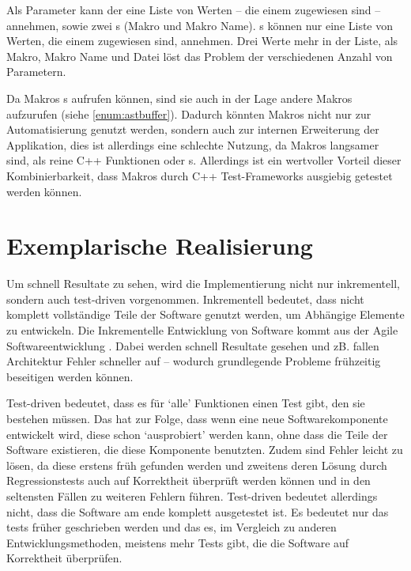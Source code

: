       Als Parameter kann der  eine Liste von  Werten -- die einem  zugewiesen sind -- annehmen, sowie zwei s (Makro und Makro Name). s können nur eine Liste von  Werten, die einem  zugewiesen sind, annehmen. Drei  Werte mehr in der Liste, als Makro, Makro Name und Datei löst das Problem der verschiedenen Anzahl von Parametern.

      Da Makros s aufrufen können, sind sie auch in der Lage andere Makros aufzurufen (siehe \ref{enum:astbuffer}). Dadurch könnten Makros nicht nur zur Automatisierung genutzt werden, sondern auch zur internen Erweiterung der Applikation, dies ist allerdings eine schlechte Nutzung, da Makros langsamer sind, als reine C++ Funktionen oder s. Allerdings ist ein wertvoller Vorteil dieser Kombinierbarkeit, dass Makros durch C++ Test-Frameworks ausgiebig getestet werden können.

\section{Exemplarische Realisierung}
\label{sec:Exemplarische Realisierung}
  Um schnell Resultate zu sehen, wird die Implementierung nicht nur inkrementell, sondern auch test-driven \autocite{beck2003test} vorgenommen. Inkrementell bedeutet, dass nicht komplett vollständige Teile der Software genutzt werden, um Abhängige Elemente zu entwickeln. Die Inkrementelle Entwicklung von Software kommt aus der Agile Softwareentwicklung \autocite{cohen2003agile}. Dabei werden schnell Resultate gesehen und zB. fallen Architektur Fehler schneller auf -- wodurch grundlegende Probleme frühzeitig beseitigen werden können.

  Test-driven bedeutet, dass es für `alle' Funktionen einen Test gibt, den sie bestehen müssen. Das hat zur Folge, dass wenn eine neue Softwarekomponente entwickelt wird, diese schon `ausprobiert' werden kann, ohne dass die Teile der Software existieren, die diese Komponente benutzten. Zudem sind Fehler leicht zu lösen, da diese erstens früh gefunden werden und zweitens deren Lösung durch Regressionstests auch auf Korrektheit überprüft werden können und in den seltensten Fällen zu weiteren Fehlern führen. Test-driven bedeutet allerdings nicht, dass die Software am ende komplett ausgetestet ist. Es bedeutet nur das tests früher geschrieben werden und das es, im Vergleich zu anderen Entwicklungsmethoden, meistens mehr Tests gibt, die die Software auf Korrektheit überprüfen.

